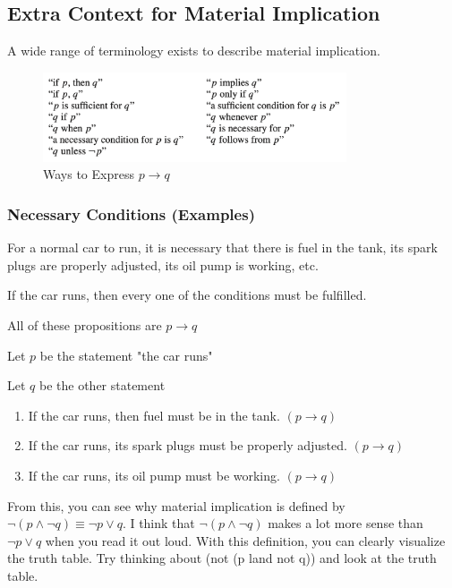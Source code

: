 \documentclass[12pt]{article}
\begin{document}
\subsection{Extra Context for Material Implication}

A wide range of terminology exists to describe material implication.

\begin{figure}[H]
    \centering
    \includegraphics[width=0.8\textwidth]{"./p_implies_q.png"}
    \caption{Ways to Express $p \to q$}
    \label{fig:p_implies_q}
\end{figure}

\subsubsection{Necessary Conditions (Examples)}

For a normal car to run, it is necessary that there is fuel in the tank,
its spark plugs are properly adjusted, its oil pump is working, etc.

If the car runs, then every one of the conditions must be fulfilled.

All of these propositions are $p \to q$

Let $p$ be the statement "the car runs"

Let $q$ be the other statement

\begin{enumerate}
\item If the car runs, then fuel must be in the tank. $(p \to q)$
\item If the car runs, its spark plugs must be properly adjusted. $(p \to q)$
\item If the car runs, its oil pump must be working. $(p \to q)$
\end{enumerate}

From this, you can see why material implication is defined by 
$\neg (p \land \neg q) \equiv \neg p \lor q$. I think that $\neg (p \land \neg q)$
makes a lot more sense than $\neg p \lor q$ when you read it out loud. With
this definition, you can clearly visualize the truth table. Try thinking about
(not (p land not q)) and look at the truth table.

\end{document}
